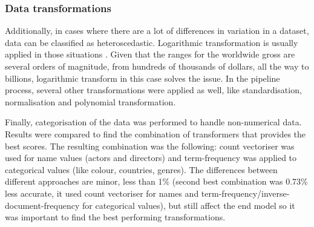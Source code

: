 \subsubsection{Data transformations}
Additionally, in cases where there are a lot of differences in variation in a dataset, data can be classified as heteroscedastic. Logarithmic transformation is usually applied in those situations \cite{kvalheim1994preprocessing}. Given that the ranges for the worldwide gross are several orders of magnitude, from hundreds of thousands of dollars, all the way to billions, logarithmic transform in this case solves the issue. In the pipeline process, several other transformations were applied as well, like standardisation, normalisation and polynomial transformation. 

Finally, categorisation of the data was performed to handle non-numerical data. Results were compared to find the combination of transformers that provides the best scores. The resulting combination was the following: count vectoriser was used for name values (actors and directors) and term-frequency was applied to categorical values (like colour, countries, genres). The differences between different approaches are minor, less than 1\% (second best combination was 0.73\% less accurate, it used count vectoriser for names and term-frequency/inverse-document-frequency for categorical values), but still affect the end model so it was important to find the best performing transformations.


